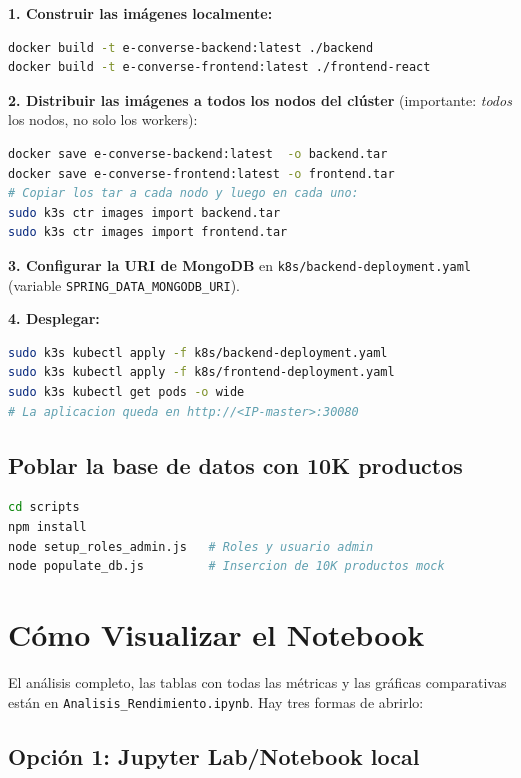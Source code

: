 \documentclass[11pt,a4paper]{article}
\begin{document}
\textbf{1. Construir las imágenes localmente:}
\begin{lstlisting}[language=bash]
docker build -t e-converse-backend:latest ./backend
docker build -t e-converse-frontend:latest ./frontend-react
\end{lstlisting}

\textbf{2. Distribuir las imágenes a todos los nodos del clúster} (importante: \emph{todos} los nodos, no solo los workers):
\begin{lstlisting}[language=bash]
docker save e-converse-backend:latest  -o backend.tar
docker save e-converse-frontend:latest -o frontend.tar
# Copiar los tar a cada nodo y luego en cada uno:
sudo k3s ctr images import backend.tar
sudo k3s ctr images import frontend.tar
\end{lstlisting}

\textbf{3. Configurar la URI de MongoDB} en \texttt{k8s/backend-deployment.yaml} (variable \texttt{SPRING\_DATA\_MONGODB\_URI}).

\textbf{4. Desplegar:}
\begin{lstlisting}[language=bash]
sudo k3s kubectl apply -f k8s/backend-deployment.yaml
sudo k3s kubectl apply -f k8s/frontend-deployment.yaml
sudo k3s kubectl get pods -o wide
# La aplicacion queda en http://<IP-master>:30080
\end{lstlisting}

\subsection{Poblar la base de datos con 10K productos}

\begin{lstlisting}[language=bash]
cd scripts
npm install
node setup_roles_admin.js   # Roles y usuario admin
node populate_db.js         # Insercion de 10K productos mock
\end{lstlisting}

\section{Cómo Visualizar el Notebook}

El análisis completo, las tablas con todas las métricas y las gráficas comparativas están en \texttt{Analisis\_Rendimiento.ipynb}. Hay tres formas de abrirlo:

\subsection{Opción 1: Jupyter Lab/Notebook local}
\end{document}
